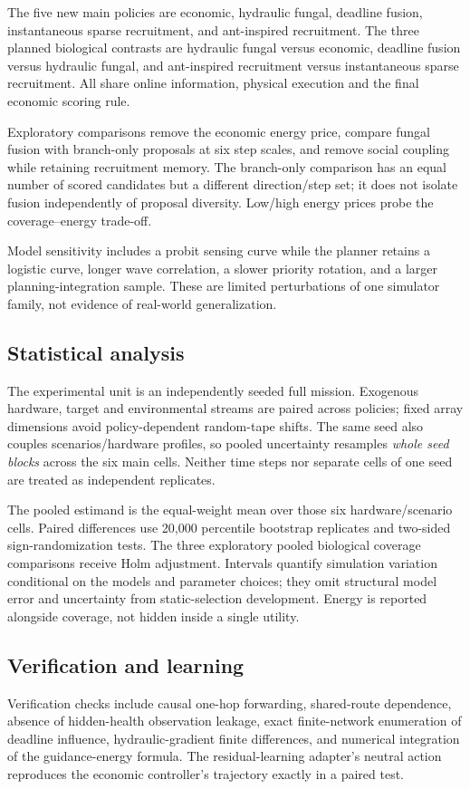 The five new main policies are economic, hydraulic fungal, deadline fusion,
instantaneous sparse recruitment, and ant-inspired recruitment.
The three planned biological contrasts are hydraulic fungal versus economic,
deadline fusion versus hydraulic fungal, and ant-inspired recruitment versus
instantaneous sparse recruitment. All share online information, physical
execution and the final economic scoring rule.

Exploratory comparisons remove the economic energy price, compare fungal
fusion with branch-only proposals at six step scales, and remove social coupling
while retaining recruitment memory. The branch-only comparison has an equal
number of scored candidates but a different direction/step set; it does not
isolate fusion independently of proposal diversity. Low/high energy prices
probe the coverage--energy trade-off.

Model sensitivity includes a probit sensing curve while the planner retains a
logistic curve, longer wave correlation, a slower priority rotation, and a
larger planning-integration sample. These are limited perturbations of one
simulator family, not evidence of real-world generalization.

\subsection{Statistical analysis}
The experimental unit is an independently seeded full mission. Exogenous
hardware, target and environmental streams are paired across policies; fixed
array dimensions avoid policy-dependent random-tape shifts. The same seed
also couples scenarios/hardware profiles, so pooled uncertainty resamples
\emph{whole seed blocks} across the six main cells.
Neither time steps nor separate cells of one seed are treated as independent
replicates.

The pooled estimand is the equal-weight mean over those six hardware/scenario
cells. Paired differences use 20,000 percentile bootstrap replicates and
two-sided sign-randomization tests. The three exploratory pooled biological
coverage comparisons receive Holm adjustment. Intervals quantify simulation
variation conditional on the models and parameter choices; they omit
structural model error and uncertainty from static-selection development.
Energy is reported alongside coverage, not hidden inside a single utility.

\subsection{Verification and learning}
Verification checks include causal one-hop forwarding, shared-route dependence,
absence of hidden-health observation leakage, exact finite-network enumeration
of deadline influence, hydraulic-gradient finite differences, and numerical
integration of the guidance-energy formula. The residual-learning adapter's
neutral action reproduces the economic controller's trajectory exactly in a
paired test.

